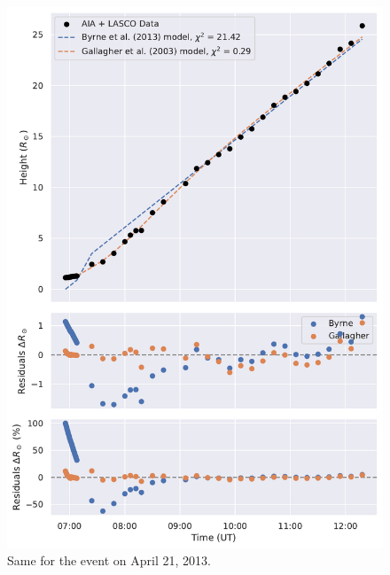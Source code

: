 \begin{figure}[!htp]
	\centering
	\includegraphics[width=0.8\hsize]{chapter2/figs/appendix/height_profile_residuals_aia_lasco_130421_01.pdf}
	\caption{Same for the event on April 21, 2013.}
\end{figure}

